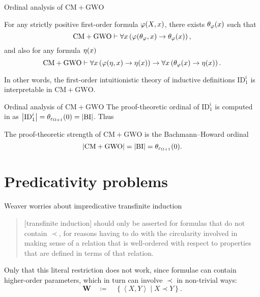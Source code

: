 \documentclass{beamer}
\theoremstyle{definition}
\newcommand{\tuple}[1]{\left\langle #1 \right\rangle}
\newcommand{\CM}{\mathrm{CM}}
\newcommand{\GWO}{\mathrm{GWO}}
\begin{document}
\begin{frame}{Ordinal analysis of $\CM + \GWO$}
  \begin{theorem}[(W., 2025)]
    For any strictly positive first-order formula $\varphi\mleft(X, x\mright)$, there exists $\theta_\varphi\mleft(x\mright)$ such that
    \[\CM + \GWO \vdash \forall x \left(\varphi\mleft(\theta_\varphi, x\mright) \rightarrow \theta_\varphi\mleft(x\mright)\right),\]
    and also for any formula $\eta\mleft(x\mright)$
    \[\CM + \GWO \vdash \forall x \left(\varphi\mleft(\eta, x\mright) \rightarrow \eta\mleft(x\mright)\right) \rightarrow \forall x \left(\theta_\varphi\mleft(x\mright) \rightarrow \eta\mleft(x\mright)\right).\]
  \end{theorem}

  In other words, the first-order intuitionistic theory of inductive definitions $\mathrm{ID}_1^i$ is interpretable in $\CM + \GWO$.
\end{frame}

\begin{frame}{Ordinal analysis of $\CM + \GWO$}
  The proof-theoretic ordinal of $\mathrm{ID}_1^i$ is computed in \cite{buchholz-pohlers78-iterated-id} as $\left|\mathrm{ID}_1^i\right| = \theta_{\varepsilon_{\Omega + 1}}\mleft(0\mright) = \left|\mathrm{BI}\right|$. Thus

  \begin{corollary}
    The proof-theoretic strength of $\mathrm{CM} + \mathrm{GWO}$ is the Bachmann--Howard ordinal
    \[\left|\CM + \GWO\right| = \left|\mathrm{BI}\right| = \theta_{\varepsilon_{\Omega + 1}}\mleft(0\mright).\]
  \end{corollary}
\end{frame}

\section{Predicativity problems}

\begin{frame}{Weaver worries about impredicative transfinite induction}
  \begin{quote}
    [transfinite induction] should only be asserted for formulas that do not contain $\prec$, for reasons having to do with the circularity involved in making sense of a relation that is well-ordered with respect to properties that are defined in terms of that relation.
  \end{quote}

  \pause

  \vspace{0.6em}

  \textellipsis Only that this literal restriction does not work, since formulae can contain higher-order parameters, which in turn can involve $\prec$ in non-trivial ways:
  \[\mathbf{W} \quad \coloneqq \quad \left\{\tuple{X, Y} \mid X \prec Y\right\}.\]
\end{frame}
\end{document}
